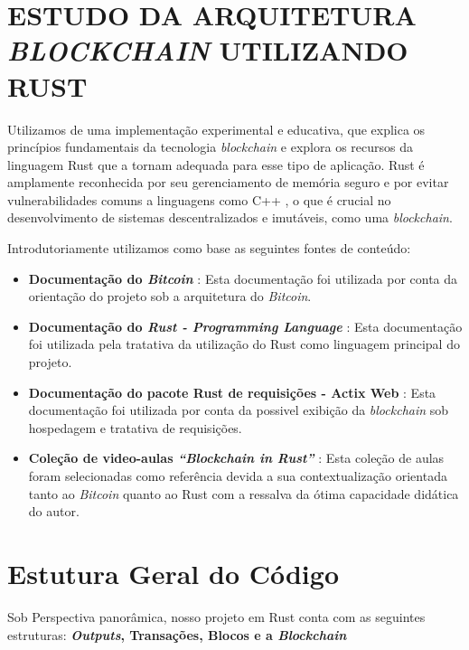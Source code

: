 \section*{ESTUDO DA ARQUITETURA \textit{BLOCKCHAIN} UTILIZANDO RUST}

Utilizamos de uma implementação experimental e educativa, que explica os princípios fundamentais da tecnologia \textit{blockchain} e explora os recursos da linguagem Rust que a tornam adequada para esse tipo de aplicação. Rust é amplamente reconhecida por seu gerenciamento de memória seguro e por evitar vulnerabilidades comuns a linguagens como C++ \cite{matsakis2014rust}, o que é crucial no desenvolvimento de sistemas descentralizados e imutáveis, como uma \textit{blockchain}.

Introdutoriamente utilizamos como base as seguintes fontes de conteúdo:
\begin{itemize}

\item \textbf{Documentação do \textit{Bitcoin}} \cite{nakamoto2008bitcoin}: Esta documentação foi utilizada por conta da orientação do projeto sob a arquitetura do \textit{Bitcoin}.

\item \textbf{Documentação do \textit{Rust - Programming Language}} \cite{rust_learn}: Esta documentação foi utilizada pela tratativa da utilização do Rust como linguagem principal do projeto.

\item \textbf{Documentação do pacote Rust de requisições - Actix Web} \cite{actix_docs}: Esta documentação foi utilizada por conta da possivel exibição da \textit{blockchain} sob hospedagem e tratativa de requisições.

\item \textbf{Coleção de video-aulas \textit{``Blockchain in Rust''}} \cite{geeklaunch_rust}: Esta coleção de aulas foram selecionadas como referência devida a sua contextualização orientada tanto ao \textit{Bitcoin} quanto ao Rust com a ressalva da ótima capacidade didática do autor. 

\end{itemize}

\section*{Estutura Geral do Código}
Sob Perspectiva panorâmica, nosso projeto em Rust conta com as seguintes estruturas: \textbf{\textit{Outputs}, Transações, Blocos e a \textit{Blockchain}}

